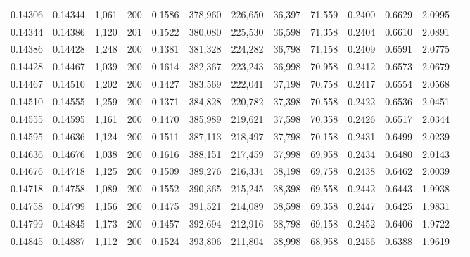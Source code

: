 \begin{tabular}{rrrrrrrrrrrrr}
0.14306 & 0.14344 & 1,061 & 200 &                                     0.1586 & 378,960 & 226,650 &  36,397 &  71,559 & 0.2400 & 0.6629 & 2.0995 \\
0.14344 & 0.14386 & 1,120 & 201 &                                     0.1522 & 380,080 & 225,530 &  36,598 &  71,358 & 0.2404 & 0.6610 & 2.0891 \\
0.14386 & 0.14428 & 1,248 & 200 &                                     0.1381 & 381,328 & 224,282 &  36,798 &  71,158 & 0.2409 & 0.6591 & 2.0775 \\
0.14428 & 0.14467 & 1,039 & 200 &                                     0.1614 & 382,367 & 223,243 &  36,998 &  70,958 & 0.2412 & 0.6573 & 2.0679 \\
0.14467 & 0.14510 & 1,202 & 200 &                                     0.1427 & 383,569 & 222,041 &  37,198 &  70,758 & 0.2417 & 0.6554 & 2.0568 \\
0.14510 & 0.14555 & 1,259 & 200 &                                     0.1371 & 384,828 & 220,782 &  37,398 &  70,558 & 0.2422 & 0.6536 & 2.0451 \\
0.14555 & 0.14595 & 1,161 & 200 &                                     0.1470 & 385,989 & 219,621 &  37,598 &  70,358 & 0.2426 & 0.6517 & 2.0344 \\
0.14595 & 0.14636 & 1,124 & 200 &                                     0.1511 & 387,113 & 218,497 &  37,798 &  70,158 & 0.2431 & 0.6499 & 2.0239 \\
0.14636 & 0.14676 & 1,038 & 200 &                                     0.1616 & 388,151 & 217,459 &  37,998 &  69,958 & 0.2434 & 0.6480 & 2.0143 \\
0.14676 & 0.14718 & 1,125 & 200 &                                     0.1509 & 389,276 & 216,334 &  38,198 &  69,758 & 0.2438 & 0.6462 & 2.0039 \\
0.14718 & 0.14758 & 1,089 & 200 &                                     0.1552 & 390,365 & 215,245 &  38,398 &  69,558 & 0.2442 & 0.6443 & 1.9938 \\
0.14758 & 0.14799 & 1,156 & 200 &                                     0.1475 & 391,521 & 214,089 &  38,598 &  69,358 & 0.2447 & 0.6425 & 1.9831 \\
0.14799 & 0.14845 & 1,173 & 200 &                                     0.1457 & 392,694 & 212,916 &  38,798 &  69,158 & 0.2452 & 0.6406 & 1.9722 \\
0.14845 & 0.14887 & 1,112 & 200 &                                     0.1524 & 393,806 & 211,804 &  38,998 &  68,958 & 0.2456 & 0.6388 & 1.9619 \\

\end{tabular}
